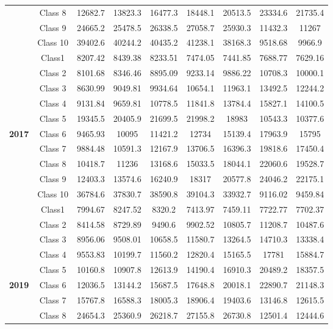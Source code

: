 \documentclass[final,5p,times,twocolumn]{elsarticle}
\begin{document}
\begin{table}[ht!]
\begin{tabular}{| ccccccccc |}
     & Class 8 & 12682.7 & 13823.3 & 16477.3 & 18448.1&  20513.5 & 23334.6 & 21735.4 \\
     & Class 9 & 24665.2 & 25478.5 & 26338.5 & 27058.7 & 25930.3 & 11432.3 & 11267 \\
     & Class 10 & 39402.6 & 40244.2 & 40435.2 & 41238.1 & 38168.3 & 9518.68 & 9966.9 \\
     \midrule
    & Class1 & 8207.42 & 8439.38 & 8233.51 & 7474.05 & 7441.85 & 7688.77 & 7629.16 \\
     & Class 2 & 8101.68 & 8346.46 & 8895.09 & 9233.14 & 9886.22 & 10708.3 & 10000.1 \\
     & Class 3 & 8630.99 & 9049.81 & 9934.64 & 10654.1 & 11963.1 & 13492.5 & 12244.2 \\
     & Class 4 & 9131.84 & 9659.81 & 10778.5 & 11841.8 & 13784.4 & 15827.1 & 14100.5 \\
     & Class 5 & 19345.5 & 20405.9 & 21699.5 & 21998.2 & 18983 & 10543.3 & 10377.6 \\
     \textbf{2017} & Class 6 & 9465.93 & 10095 & 11421.2 & 12734 & 15139.4 & 17963.9 & 15795 \\
     & Class 7 & 9884.48 & 10591.3 & 12167.9 & 13706.5 & 16396.3 & 19818.6 & 17450.4 \\
     & Class 8 & 10418.7 & 11236 & 13168.6 & 15033.5 & 18044.1 & 22060.6 & 19528.7 \\
     & Class 9 & 12403.3 & 13574.6 & 16240.9 & 18317 & 20577.8 & 24046.2 & 22175.1 \\
     & Class 10 & 36784.6 & 37830.7 & 38590.8 & 39104.3 & 33932.7 & 9116.02 & 9459.84 \\
     \midrule
     & Class1 & 7994.67 & 8247.52 & 8320.2 & 7413.97 & 7459.11 & 7722.77 & 7702.37 \\
    & Class 2 & 8414.58 & 8729.89 & 9490.6 & 9902.52 & 10805.7 & 11208.7 & 10487.6 \\
     & Class 3 & 8956.06 & 9508.01 & 10658.5 & 11580.7 & 13264.5 & 14710.3 & 13338.4 \\
     & Class 4 & 9553.83 & 10199.7 & 11560.2 & 12820.4 & 15165.5 & 17781 & 15884.7 \\
     & Class 5 & 10160.8 & 10907.8 & 12613.9 & 14190.4 & 16910.3 & 20489.2 & 18357.5 \\
     \textbf{2019} & Class 6 & 12036.5 & 13144.2 & 15687.5 & 17648.8 & 20018.1 & 22890.7 & 21148.3 \\
     & Class 7 & 15767.8 & 16588.3 & 18005.3 & 18906.4 & 19403.6 & 13146.8 & 12615.5 \\
     & Class 8 & 24654.3 & 25360.9 & 26218.7 & 27155.8 & 26730.8 & 12501.4 & 12444.6 \\

\end{tabular}
\end{table}
\end{document}
